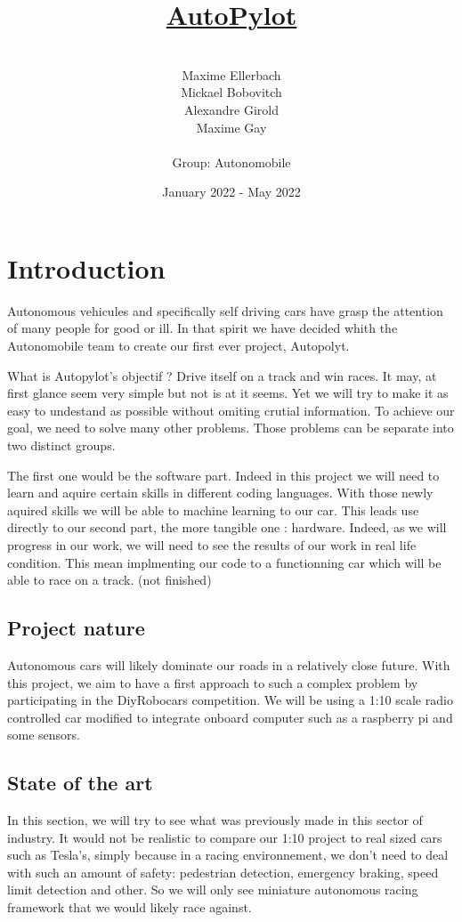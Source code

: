 \documentclass[12pt]{article}
\title{\underline{AutoPylot}}
\date{January 2022 - May 2022}
\author{%
    \\
    Maxime Ellerbach \\
    Mickael Bobovitch \\
    Alexandre Girold \\
    Maxime Gay \\ \\
    Group: Autonomobile 
    }
\begin{document}
\maketitle
\newpage

\tableofcontents
\newpage

\section{Introduction}
Autonomous vehicules and specifically self driving cars have grasp the attention of many people for good or ill. In that spirit we have decided whith the Autonomobile team to create our first ever project, Autopolyt.

	What is Autopylot's objectif ? Drive itself on a track and win races. It may, at first glance seem very simple but not is at it seems. Yet we will try to make it as easy to undestand as possible without omiting crutial information. To achieve our goal, we need to solve many other problems. Those problems can be separate into two distinct groups. 
    
The first one would be the software part. Indeed in this project we will need to learn and aquire certain skills in different coding languages. With those newly aquired skills we will be able to machine learning to our car. This leads use directly to our second part, the more tangible one : hardware. Indeed, as we will progress in our work, we will need to see the results of our work in real life condition. This mean implmenting our code to a functionning car which will be able to race on a track. (not finished)

\subsection{Project nature}
Autonomous cars will likely dominate our roads in a relatively close future.
With this project, we aim to have a first approach to such a complex problem by participating in the DiyRobocars competition.
We will be using a 1:10 scale radio controlled car modified to integrate onboard computer such as a raspberry pi and some sensors.

\subsection{State of the art}
In this section, we will try to see what was previously made in this sector of industry.
It would not be realistic to compare our 1:10 project to real sized cars such as Tesla's, simply because in a racing environnement,
we don't need to deal with such an amount of safety: pedestrian detection, emergency braking, speed limit detection and other.
So we will only see miniature autonomous racing framework that we would likely race against.\\
\end{document}
